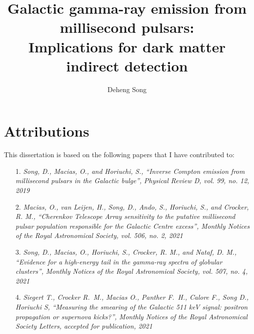 \documentclass[doublespace,nopageskip]{VTthesis} %
\title{Galactic gamma-ray emission from millisecond pulsars: \\Implications for dark matter indirect detection}
\author{Deheng Song}
\begin{document}
\frontmatter
\maketitle

\chapter*{Attributions}

This dissertation is based on the following papers that I have contributed to:
\begin{itemize}
    \item[1.] \emph{Song, D., Macias, O., and Horiuchi, S., “Inverse Compton emission from millisecond pulsars in the Galactic bulge”, Physical Review D, vol. 99, no. 12, 2019}
    \item[2.] \emph{Macias, O., van Leijen, H., Song, D., Ando, S., Horiuchi, S., and Crocker, R. M., “Cherenkov Telescope Array sensitivity to the putative millisecond pulsar population responsible for the Galactic Centre excess”, Monthly Notices of the Royal Astronomical Society, vol. 506, no. 2, 2021}
    \item[3.] \emph{Song, D., Macias, O., Horiuchi, S., Crocker, R. M., and Nataf, D. M., “Evidence for a high-energy tail in the gamma-ray spectra of globular clusters”, Monthly Notices of the Royal Astronomical Society, vol. 507, no. 4, 2021}
    \item[4.] \emph{Siegert T., Crocker R.~M., Macias O., Panther F.~H., Calore F., Song D., Horiuchi S, “Measuring the smearing of the Galactic 511 keV signal: positron propagation or supernova kicks?”, Monthly Notices of the Royal Astronomical Society Letters, accepted for publication, 2021}
\end{itemize}

\tableofcontents

\listoffigures
\listoftables

\end{document}
